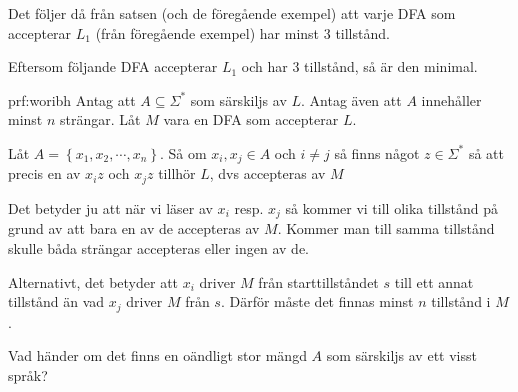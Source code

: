 \par\bigskip
\noindent Det följer då från satsen (och de föregående exempel) att varje DFA som accepterar $L_1$ (från föregående exempel) har minst 3 tillstånd.
\par\bigskip
\noindent Eftersom följande DFA accepterar $L_1$ och har 3 tillstånd, så är den minimal. 
\begin{figure}[ht!]
    \centering
    \caption{}
\end{figure}
\par\bigskip
\begin{prf}[Sats 9.7]{prf:woribh}
  Antag att $A\subseteq\Sigma^*$ som särskiljs av $L$. Antag även att $A$ innehåller minst $n$ strängar. Låt $M$ vara en DFA som accepterar $L$.\par
  \noindent Låt $A = \left\{x_1,x_2,\cdots,x_n\right\}$. Så om $x_i, x_j\in A$ och $i\neq j$ så finns något $z\in\Sigma^*$ så att precis en av $x_iz$ och $x_jz$ tillhör $L$, dvs accepteras av $M$
  \par\bigskip
  \noindent Det betyder ju att när vi läser av $x_i$ resp. $x_j$ så kommer vi till olika tillstånd på grund av att bara en av de accepteras av $M$. Kommer man till samma tillstånd skulle båda strängar accepteras eller ingen av de. 
  \par\bigskip
  \noindent Alternativt, det betyder att $x_i$ driver $M$ från starttillståndet $s$ till ett annat tillstånd än vad $x_j$ driver $M$ från $s$. Därför måste det finnas minst $n$ tillstånd i $M$.
\end{prf}
\par\bigskip
\noindent Vad händer om det finns en oändligt stor mängd $A$ som särskiljs av ett visst språk?

